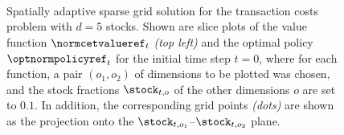 \begin{figure}
  \hfill%
  \hfill%
  \hfill%
  \\[1mm]%
  \hfill%
  \hfill%
  \hfill%
  \\[1mm]%
  \hfill%
  \hfill%
  \hfill%
  \\[1mm]%
  \hfill%
  \hfill%
  \hfill%
  \caption[Sparse grid solution for the five-dimensional TCP]{%
    Spatially adaptive sparse grid solution for the transaction costs problem
    with $d = 5$ stocks.
    \vspace{-0.15em}%
    Shown are slice plots of
    the value function $\normcetvalueref_t$ \emph{(top left)} and
    the optimal policy $\optnormpolicyref_t$ for the initial time step $t = 0$,
    where for each function, a pair $(o_1, o_2)$
    of dimensions to be plotted was chosen,
    and the stock fractions $\stock_{t,o}$ of the other dimensions $o$
    are set to $0.1$.
    In addition, the corresponding grid points \emph{(dots)}
    are shown as the projection onto the
    $\stock_{t,o_1}$--$\stock_{t,o_2}$ plane.%
  }%
  \label{fig:financeSolution5DSparseGrid}%
\end{figure}

